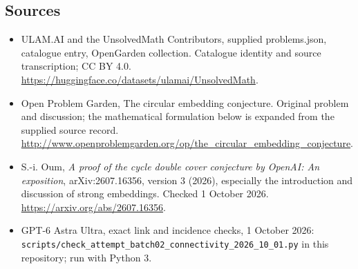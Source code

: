 \documentclass[11pt,a4paper]{article}
\begin{document}
\subsection{Sources}
\begin{itemize}
\item[S1] ULAM.AI and the UnsolvedMath Contributors, supplied problems.json, catalogue entry, OpenGarden collection. Catalogue identity and source transcription; CC BY 4.0.
\url{https://huggingface.co/datasets/ulamai/UnsolvedMath}.
\item[S2] Open Problem Garden, The circular embedding conjecture. Original problem and discussion; the mathematical formulation below is expanded from the supplied source record.
\url{http://www.openproblemgarden.org/op/the_circular_embedding_conjecture}.
\item[S3] S.-i. Oum, \emph{A proof of the cycle double cover conjecture by OpenAI: An exposition}, arXiv:2607.16356, version 3 (2026), especially the introduction and discussion of strong embeddings. Checked 1 October 2026.
\url{https://arxiv.org/abs/2607.16356}.
\item[S4] GPT-6 Astra Ultra, exact link and incidence checks, 1 October 2026: \texttt{scripts/check\_attempt\_batch02\_connectivity\_2026\_10\_01.py} in this repository; run with Python 3.
\end{itemize}
\end{document}
